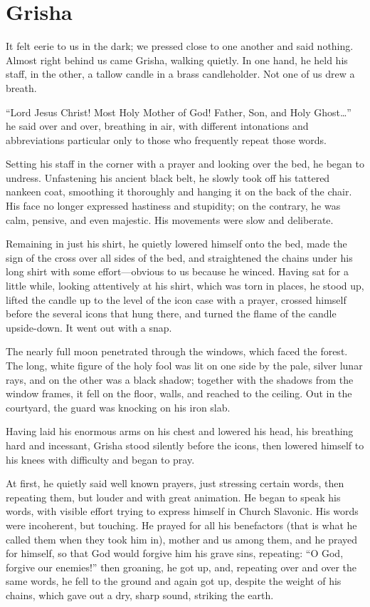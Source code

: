 \chapter{Grisha} %

It felt eerie to us in the dark; we pressed close to one another and said nothing. Almost right behind us came Grisha, walking quietly. In one hand, he held his staff, in the other, a tallow candle in a brass candleholder. Not one of us drew a breath.

``Lord Jesus Christ! Most Holy Mother of God! Father, Son, and Holy Ghost\ldots{}'' he said over and over, breathing in air, with different intonations and abbreviations particular only to those who frequently repeat those words.

Setting his staff in the corner with a prayer and looking over the bed, he began to undress. Unfastening his ancient black belt, he slowly took off his tattered nankeen coat, smoothing it thoroughly and hanging it on the back of the chair. His face no longer expressed hastiness and stupidity; on the contrary, he was calm, pensive, and even majestic. His movements were slow and deliberate.

Remaining in just his shirt, he quietly lowered himself onto the bed, made the sign of the cross over all sides of the bed, and straightened the chains under his long shirt with some effort---obvious to us because he winced. Having sat for a little while, looking attentively at his shirt, which was torn in places, he stood up, lifted the candle up to the level of the icon case with a prayer, crossed himself before the several icons that hung there, and turned the flame of the candle upside-down. It went out with a snap.

The nearly full moon penetrated through the windows, which faced the forest. The long, white figure of the holy fool was lit on one side by the pale, silver lunar rays, and on the other was a black shadow; together with the shadows from the window frames, it fell on the floor, walls, and reached to the ceiling. Out in the courtyard, the guard was knocking on his iron slab.

Having laid his enormous arms on his chest and lowered his head, his breathing hard and incessant, Grisha stood silently before the icons, then lowered himself to his knees with difficulty and began to pray.

At first, he quietly said well known prayers, just stressing certain words, then repeating them, but louder and with great animation. He began to speak his words, with visible effort trying to express himself in Church Slavonic. His words were incoherent, but touching. He prayed for all his benefactors (that is what he called them when they took him in), mother and us among them, and he prayed for himself, so that God would forgive him his grave sins, repeating: ``O God, forgive our enemies!'' then groaning, he got up, and, repeating over and over the same words, he fell to the ground and again got up, despite the weight of his chains, which gave out a dry, sharp sound, striking the earth.

